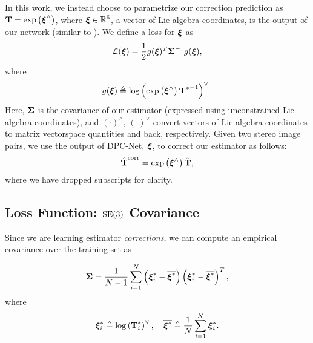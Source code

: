 In this work, we instead choose to parametrize our correction prediction as $\boldsymbol{\mathbf{T}} = \mathrm{exp}\left({\boldsymbol{\mathbf{\xi}}}^{\wedge}\right)$, where $\boldsymbol{\mathbf{\xi}} \in \mathbb{R}^6$, a vector of Lie algebra coordinates, is the output of our network (similar to \cite{Handa2016-hm}). We define a loss for $\boldsymbol{\mathbf{\xi}}$ as 
\begin{equation}
	\label{eq:se3loss_fn}
\mathcal{L} (\boldsymbol{\mathbf{\xi}}) = \frac{1}{2} g({\boldsymbol{\mathbf{\xi}}})^T {\boldsymbol{\mathbf{\Sigma}}}^{-1} g({\boldsymbol{\mathbf{\xi}}}),
\end{equation} where 
\begin{equation}
	\label{eq:se3logmap_fn}
	g({\boldsymbol{\mathbf{\xi}}}) \triangleq \mathrm{log}\left({\mathrm{exp}\left({\boldsymbol{\mathbf{\xi}}}^{\wedge}\right) {\boldsymbol{\mathbf{T}}^*}^{-1}}\right)^{\vee}.
\end{equation}
Here, $\boldsymbol{\mathbf{\Sigma}}$ is the covariance of our estimator (expressed using unconstrained Lie algebra coordinates), and $(\cdot)^\wedge$, $(\cdot)^\vee$ convert vectors of Lie algebra coordinates to matrix vectorspace quantities and back, respectively.
Given two stereo image pairs, we use the output of DPC-Net, $\boldsymbol{\mathbf{\xi}}$, to correct our estimator as follows:
\begin{align}
	\hat{\boldsymbol{\mathbf{T}}}^{\mathrm{corr}} = \mathrm{exp}\left({\boldsymbol{\mathbf{\xi}}}^{\wedge}\right) \hat{\boldsymbol{\mathbf{T}}},
\end{align}
where we have dropped subscripts for clarity.

\subsection{Loss Function: $\mathrm{SE}(3)$ Covariance}

Since we are learning estimator \textit{corrections}, we can compute an empirical covariance over the training set as

\begin{equation}
\boldsymbol{\mathbf{\Sigma}} = \frac{1}{N-1} \sum_{i=1}^{N} \left( \boldsymbol{\mathbf{\xi}}^*_i -\overline{\boldsymbol{\mathbf{\xi}}^*} \right) \left( \boldsymbol{\mathbf{\xi}}^*_i -\overline{\boldsymbol{\mathbf{\xi}}^*} \right)^T,
\end{equation}
where 
\begin{equation}
	\boldsymbol{\mathbf{\xi}}^*_i \triangleq \mathrm{log}\left({\boldsymbol{\mathbf{T}}^*_i}\right)^{\vee}, \quad \overline{\boldsymbol{\mathbf{\xi}}^*} \triangleq \frac{1}{N} \sum_{i=1}^N \boldsymbol{\mathbf{\xi}}^*_i.
\end{equation}

